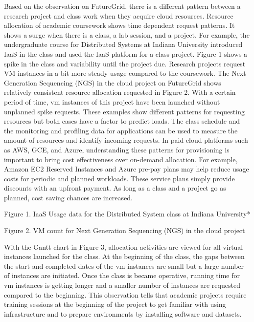 \documentclass{sig-alternate}
\begin{document}
Based on the observation on FutureGrid, there is a different pattern between a research project and class work when they acquire cloud resources.  Resource allocation of academic coursework shows time dependent request patterns. It shows a surge when there is a class, a lab session, and a project. For example, the undergraduate course for Distributed Systems at Indiana University introduced IaaS in the class and used the IaaS platform for a class project. Figure 1 shows a spike in the class and variability until the project due. Research projects request VM instances in a bit more steady usage compared to the coursework. The Next Generation Sequencing (NGS) in the cloud project on FutureGrid shows relatively consistent resource allocation requested in Figure 2. With a certain period of time, vm instances of this project have been launched without unplanned spike requests. These examples show different patterns for requesting resources but both cases have a factor to predict loads. The class schedule and the monitoring and profiling data for applications can be used to measure the amount of resources and identify incoming requests. In paid cloud platforms such as AWS, GCE, and Azure, understanding these patterns for provisioning is important to bring cost effectiveness over on-demand allocation. For example, Amazon EC2 Reserved Instances and Azure pre-pay plans may help reduce usage costs for periodic and planned workloads. These service plans simply provide discounts with an upfront payment. As long as a class and a project go as planned, cost saving chances are increased. 

Figure 1. IaaS Usage data for the Distributed System class at Indiana University*


 
Figure 2. VM count for Next Generation Sequencing (NGS) in the cloud project

With the Gantt chart in Figure 3, allocation activities are viewed for all virtual instances launched for the class. At the beginning of the class, the gaps between the start and completed dates of the vm instances are small but a large number of instances are initiated. Once the class is became operative,  running time for vm instances is getting longer and a smaller number of instances are requested compared to the beginning. This observation tells that academic projects require training sessions at the beginning of the project to get familiar with using infrastructure and to prepare environments by installing software and datasets.
\end{document}
